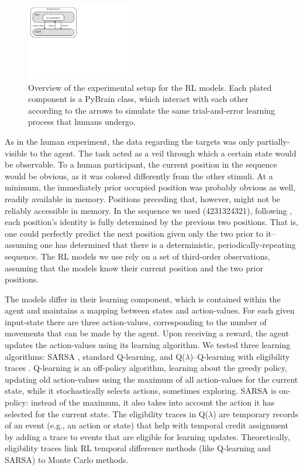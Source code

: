 \documentclass[man,floatsintext]{apa6}
\begin{document}
\begin{figure}[ht]
  \centering
  \includegraphics[width=0.4\textwidth]{figures/RL_model}
  \caption{Overview of the experimental setup for the RL models. Each plated component is a PyBrain class, which interact with each other according to the arrows to simulate the same trial-and-error learning process that humans undergo.}
  \label{fig:rl-model}
\end{figure} 

As in the human experiment, the data regarding the targets was only partially-visible to the agent. The task acted as a veil through which a certain state would be observable. To a human participant, the current position in the sequence would be obvious, as it was colored differently from the other stimuli. At a minimum, the immediately prior occupied position was probably obvious as well, readily available in memory. Positions preceding that, however, might not be reliably accessible in memory. In the sequence we used (4231324321), following \cite{Nissen:1987}, each position's identity is fully determined by the previous two positions. That is, one could perfectly predict the next position given only the two prior to it--assuming one has determined that there is a deterministic, periodically-repeating sequence. The RL models we use rely on a set of third-order observations, assuming that the models know their current position and the two prior positions.

The models differ in their learning component, which is contained within the agent and maintains a mapping between states and action-values. For each given input-state there are three action-values, corresponding to the number of movements that can be made by the agent. Upon receiving a reward, the agent updates the action-values using its learning algorithm. We tested three learning algorithms: SARSA \cite{Rummery94on-lineq-learning}, standard Q-learning, and Q($\lambda$)--Q-learning with eligibility traces \cite{Watkins:1989}. Q-learning is an off-policy algorithm, learning about the greedy policy, updating old action-values using the maximum of all action-values for the current state, while it stochastically selects actions, sometimes exploring. SARSA is on-policy: instead of the maximum, it also takes into account the action it has selected for the current state. The eligibility traces in Q($\lambda$) are temporary records of an event (e.g., an action or state) that help with temporal credit assignment by adding a trace to events that are eligible for learning updates. Theoretically, eligibility traces link RL temporal difference methods (like Q-learning and SARSA) to Monte Carlo methods.
\end{document}
